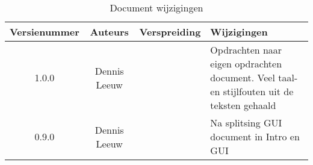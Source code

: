 \begin{flushleft}
\begin{table}[h!]
\centering
\begin{tabularx}{\textwidth}{ |c|c|c|X| }
\hline
	Versienummer &
	Auteurs &
	Verspreiding &
	Wijzigingen\\
\hline
	1.0.0 &
	Dennis Leeuw &
	 &
	Opdrachten naar eigen opdrachten document. Veel taal- en stijlfouten uit de teksten gehaald\\
\hline
	0.9.0 &
	Dennis Leeuw &
	 &
	Na splitsing GUI document in Intro en GUI\\
\hline
\end{tabularx}
\caption{Document wijzigingen}
\label{table:1}
\end{table}
\end{flushleft}


